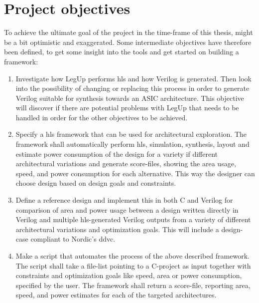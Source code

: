 \section{Project objectives}
To achieve the ultimate goal of the project in the time-frame of this thesis, might be a bit optimistic and exaggerated. Some intermediate objectives have therefore been defined, to get some insight into the tools and get started on building a framework:
\begin{enumerate}
    \item Investigate how LegUp performs \gls{hls} and how Verilog is generated. Then look into the possibility of changing or replacing this process in order to generate Verilog suitable for synthesis towards an ASIC architecture. This objective will discover if there are potential problems with LegUp that needs to be handled in order for the other objectives to be achieved.
    \item Specify a \gls{hls} framework that can be used for architectural exploration. The framework shall automatically perform \gls{hls}, simulation, synthesis, layout and estimate power consumption of the design for a variety if different architectural variations and generate score-files, showing the area usage, speed, and power consumption for each alternative. This way the designer can choose design based on design goals and constraints.
    \item Define a reference design and implement this in both C and Verilog for comparison of area and power usage between a design written directly in Verilog and multiple \gls{hls}-generated Verilog outputs from a variety of different architectural variations and optimization goals. This will include a design-case compliant to Nordic’s \gls{ddvc}.
    \item Make a script that automates the process of the above described framework. The script shall take a file-list pointing to a C-project as input together with constraints and optimization goals like speed, area or power consumption, specified by the user. The framework shall return a score-file, reporting area, speed, and power estimates for each of the targeted architectures.
\end{enumerate}

